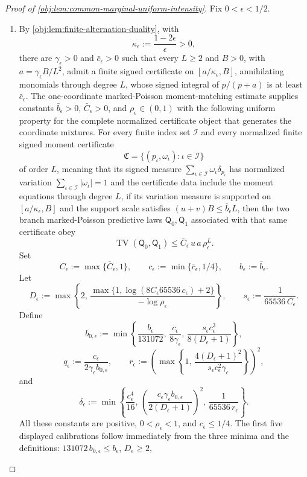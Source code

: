 \documentclass[11pt]{article}
\begin{document}
\begin{proof}[Proof of \cref{obj:lem:common-marginal-uniform-intensity}]
Fix \(0<\epsilon<1/2\).
\begin{enumerate}
\item By \cref{obj:lem:finite-alternation-duality}, with
\[
\kappa_\epsilon:=\frac{1-2\epsilon}{\epsilon}>0,
\]
there are \(\gamma_\epsilon>0\) and \(\bar c_\epsilon>0\) such that every \(L\ge2\) and \(B>0\), with \(a=\gamma_\epsilon B/L^2\), admit a finite signed certificate on \([a/\kappa_\epsilon,B]\), annihilating monomials through degree \(L\), whose signed integral of \(p/(p+a)\) is at least \(\bar c_\epsilon\). The one-coordinate marked-Poisson moment-matching estimate supplies constants \(\bar b_\epsilon>0\), \(\bar C_\epsilon>0\), and \(\rho_\epsilon\in(0,1)\) with the following uniform property for the complete normalized certificate object that generates the coordinate mixtures. For every finite index set \(\mathcal I\) and every normalized finite signed moment certificate
\[
\mathfrak C=\{(p_\iota,\omega_\iota):\iota\in\mathcal I\}
\]
of order \(L\), meaning that its signed measure \(\sum_{\iota\in\mathcal I}\omega_\iota\delta_{p_\iota}\) has normalized variation \(\sum_{\iota\in\mathcal I}|\omega_\iota|=1\) and the certificate data include the moment equations through degree \(L\), if its variation measure is supported on \([a/\kappa_\epsilon,B]\) and the support scale satisfies \((u+v)B\le \bar b_\epsilon L\), then the two branch marked-Poisson predictive laws \(\mathsf Q_0,\mathsf Q_1\) associated with that same certificate obey
\[
\operatorname{TV}(\mathsf Q_0,\mathsf Q_1)
 \le \bar C_\epsilon\,u\,a\,\rho_\epsilon^L .
\] Set
\[
C_\epsilon:=\max\{\bar C_\epsilon,1\},\qquad
c_\epsilon:=\min\{\bar c_\epsilon,1/4\},\qquad
b_\epsilon:=\bar b_\epsilon .
\]
Let
\[
D_\epsilon
:=\max\left\{
2,\,
\frac{\max\{1,\log(8C_\epsilon 65536\,c_\epsilon)+2\}}
{-\log\rho_\epsilon}
\right\},
\qquad
s_\epsilon:=\frac1{65536\,C_\epsilon}.
\]
Define
\[
b_{0,\epsilon}
:=
\min\left\{
\frac{b_\epsilon}{131072},\,
\frac{c_\epsilon}{8\gamma_\epsilon},\,
\frac{s_\epsilon c_\epsilon^3}{8(D_\epsilon+1)}
\right\},
\]
\[
q_\epsilon:=\frac{c_\epsilon}{2\gamma_\epsilon b_{0,\epsilon}},
\qquad
r_\epsilon
:=
\left(
\max\left\{
1,\,
\frac{4(D_\epsilon+1)^2}{s_\epsilon c_\epsilon^2\gamma_\epsilon}
\right\}
\right)^2,
\]
and
\[
\delta_\epsilon
:=
\min\left\{
\frac{c_\epsilon^4}{16},\,
\left(\frac{c_\epsilon\gamma_\epsilon b_{0,\epsilon}}
{2(D_\epsilon+1)}\right)^2,\,
\frac{1}{65536\,r_\epsilon}
\right\}.
\]
All these constants are positive, \(0<\rho_\epsilon<1\), and \(c_\epsilon\le1/4\). The first five displayed calibrations follow immediately from the three minima and the definitions: \(131072\,b_{0,\epsilon}\le b_\epsilon\), \(D_\epsilon\ge2\),

\end{enumerate}
\end{proof}
\end{document}

